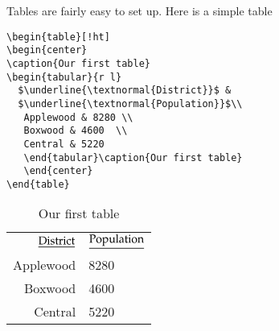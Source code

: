 Tables are fairly easy to set up. Here is a simple table
\begin{singlespace}\small
\begin{verbatim}
\begin{table}[!ht]
\begin{center}
\caption{Our first table}
\begin{tabular}{r l}
  $\underline{\textnormal{District}}$ &  
  $\underline{\textnormal{Population}}$\\
   Applewood & 8280 \\
   Boxwood & 4600  \\
   Central & 5220
   \end{tabular}\caption{Our first table}
   \end{center}
\end{table}
\end{verbatim}
\end{singlespace}
\begin{table}[!ht]
\begin{center}
\caption{Our first table}
\begin{tabular}{r l}
  $\underline{\textnormal{District}}$ &
    $\underline{\textnormal{Population}}$\\
   Applewood & 8280 \\
   Boxwood & 4600  \\
   Central & 5220
   \end{tabular}
   \end{center}
\end{table}

